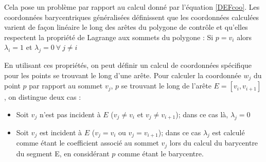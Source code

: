 Cela pose un problème par rapport au calcul donné par l'équation \ref{DEFcoo}.
Les coordonnées barycentriques généralisées définissent que les coordonnées
calculées varient de façon linéaire le long des arêtes du polygone de contrôle
et qu'elles respectent la propriété de Lagrange aux sommets du polygone : Si
$p = v_i$ alors $\lambda_i = 1$ et $\lambda_j = 0 ~\forall~ j \neq i$

En utilisant ces propriétés, on peut définir un calcul de coordonnées
spécifique pour les points se trouvant le long d'une arête. Pour calculer la
coordonnée $w_j$ du point $p$ par rapport au sommet $v_j$, $p$ se trouvant le
long de l'arête $E = [v_i,v_{i+1}]$, on distingue deux cas :

\begin{itemize}

\item Soit $v_j$ n'est pas incident à $E$ ($v_j \neq v_i$ et $v_j \neq
v_{i+1}$); dans ce cas là, $\lambda_j = 0$

\item Soit $v_j$ est incident à $E$ ($v_j = v_i$ ou $v_j = v_{i+1}$); dans ce
cas $\lambda_j$ est calculé comme étant le coefficient associé au sommet $v_j$
lors du calcul du barycentre du segment E, en considérant $p$ comme étant le
barycentre.

\end{itemize}
